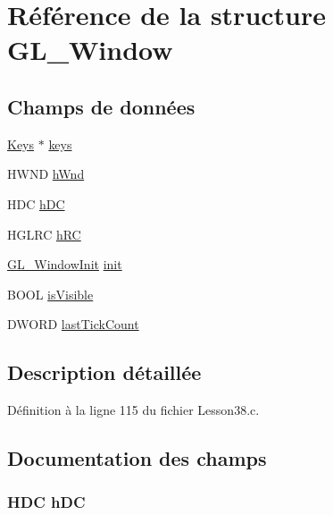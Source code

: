 \hypertarget{struct_g_l___window}{}\section{Référence de la structure G\+L\+\_\+\+Window}
\label{struct_g_l___window}
\subsection*{Champs de données}
\begin{DoxyCompactItemize}
\item 
\hyperlink{struct_keys}{Keys} $\ast$ \hyperlink{struct_g_l___window_ab7b606bf89fcfc47c79e743ba0acc6f5}{keys}
\item 
H\+W\+ND \hyperlink{struct_g_l___window_afec4341c234519e145bac6f0e5edaa51}{h\+Wnd}
\item 
H\+DC \hyperlink{struct_g_l___window_a78f6446a0e13adc7b7b2f239112ac785}{h\+DC}
\item 
H\+G\+L\+RC \hyperlink{struct_g_l___window_a874963259c7cd998acfe6e187fbdb4c1}{h\+RC}
\item 
\hyperlink{struct_g_l___window_init}{G\+L\+\_\+\+Window\+Init} \hyperlink{struct_g_l___window_ab6f3629ef0a0509d5684dcdc796f9351}{init}
\item 
B\+O\+OL \hyperlink{struct_g_l___window_aec65890e2f31eaa6ca53c56b5ea79f76}{is\+Visible}
\item 
D\+W\+O\+RD \hyperlink{struct_g_l___window_ac8c5d2d3217a8b62132c007b62fd3e1e}{last\+Tick\+Count}
\end{DoxyCompactItemize}


\subsection{Description détaillée}


Définition à la ligne 115 du fichier Lesson38.\+c.



\subsection{Documentation des champs}
\subsubsection[{\texorpdfstring{h\+DC}{hDC}}]{\setlength{\rightskip}{0pt plus 5cm}H\+DC h\+DC}\hypertarget{struct_g_l___window_a78f6446a0e13adc7b7b2f239112ac785}{}\label{struct_g_l___window_a78f6446a0e13adc7b7b2f239112ac785}


